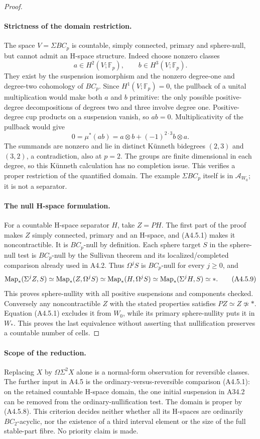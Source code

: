 \begin{proof}
\paragraph{Strictness of the domain restriction.}
The space $V=\Sigma BC_p$ is countable, simply connected,
primary and sphere-null, but cannot admit an H-space structure.
Indeed choose nonzero classes
\[
 a\in H^2(V;\mathbb F_p),\qquad b\in H^3(V;\mathbb F_p).
\]
They exist by the suspension isomorphism and the nonzero
degree-one and degree-two cohomology of $BC_p$.
Since $H^1(V;\mathbb F_p)=0$, the pullback of a unital
multiplication would make both $a$ and $b$ primitive: the only
possible positive-degree decompositions of degrees two and three
involve degree one.  Positive-degree cup products on a suspension
vanish, so $ab=0$.  Multiplicativity of the pullback would give
\[
 0=\mu^*(ab)=a\otimes b+(-1)^{2\cdot3}b\otimes a.
 \tag{A4.5.8}
\]
The summands are nonzero and lie in distinct K\"unneth bidegrees
$(2,3)$ and $(3,2)$, a contradiction, also at $p=2$.
The groups are finite dimensional in each degree, so this
K\"unneth calculation has no completion issue.
This verifies a proper restriction of the quantified domain.
The example $\Sigma BC_p$ itself is in $\mathcal A_{W_0}$;
it is not a separator.

\paragraph{The null H-space formulation.}
For a countable H-space separator $H$, take $Z=PH$.
The first part of the proof makes $Z$ simply connected,
primary and an H-space, and \textup{(A4.5.1)} makes it
noncontractible.  It is $BC_p$-null by definition.
Each sphere target $S$ in the sphere-null test is $BC_p$-null
by the Sullivan theorem and its localized/completed comparison
already used in A4.2.  Thus $\Omega^jS$ is $BC_p$-null for
every $j\geq0$, and
\[
 \operatorname{Map}_*(\Sigma^jZ,S)
 \simeq\operatorname{Map}_*(Z,\Omega^jS)
 \simeq\operatorname{Map}_*(H,\Omega^jS)
 \simeq\operatorname{Map}_*(\Sigma^jH,S)
 \simeq *.
 \tag{A4.5.9}
\]
This proves sphere-nullity with all positive suspensions and
components checked.  Conversely any noncontractible $Z$ with
the stated properties satisfies $PZ\simeq Z\not\simeq *$.
Equation \textup{(A4.5.1)} excludes it from $W_0$, while its
primary sphere-nullity puts it in $W_*$.  This proves the last
equivalence without asserting that nullification preserves a
countable number of cells.
\end{proof}

\paragraph{Scope of the reduction.}
Replacing $X$ by $\Omega\Sigma^2X$ alone is a normal-form
observation for reversible classes.  The further input in A4.5
is the ordinary-versus-reversible comparison
\textup{(A4.5.1)}: on the retained countable H-space domain,
the one initial suspension in A34.2 can be removed from the
ordinary-nullification test.  The domain is proper by
\textup{(A4.5.8)}.  This criterion decides neither whether all
its H-spaces are ordinarily $BC_2$-acyclic, nor the existence
of a third interval element or the size of the full stable-part
fibre.  No priority claim is made.


